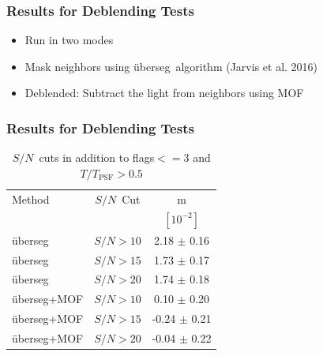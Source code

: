 \documentclass{beamer}
\newcommand{\snr}{$S/N$}
\newcommand{\uberseg}{{\color{lightsteelblue} {\"u}berseg}}
\newcommand{\MOF}{{\color{brightred}MOF}}
\begin{document}
\frame
{

    \frametitle{Results for Deblending Tests}



    \begin{itemize}

        \item Run in two modes

        \item Mask neighbors using \uberseg\ algorithm (Jarvis et al. 2016)

        \item Deblended: Subtract the light from neighbors using \MOF


    \end{itemize}


}

\frame
{

    \frametitle{Results for Deblending Tests}

    \begin{table}
        \centering
        \begin{tabular}{ l c c}
            \hline
            Method         & \snr\ Cut & m            \\
                       &           & $[10^{-2}]$  \\
            \hline
            \hline

            \uberseg       & \snr$ > 10$ & 2.18 $\pm$ 0.16  \\
            \uberseg       & \snr$ > 15$ & 1.73 $\pm$ 0.17  \\
            \uberseg       & \snr$ > 20$ & 1.74 $\pm$ 0.18  \\


            \hline

            \uberseg+\MOF   & \snr$ > 10$ & 0.10 $\pm$ 0.20  \\
            \uberseg+\MOF   & \snr$ > 15$ & -0.24 $\pm$ 0.21 \\
            \uberseg+\MOF   & \snr$ > 20$ & -0.04 $\pm$ 0.22 \\



            \hline
        \end{tabular}

        \caption{\snr\ cuts in addition to flags$<= 3$ and
        $T/T_{\mathrm{PSF}} > 0.5$}
    \end{table}


}
\end{document}

